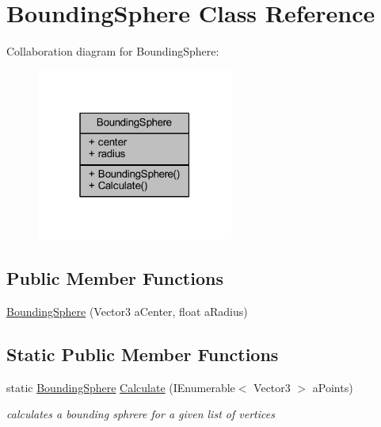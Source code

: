 \hypertarget{class_bounding_sphere}{}\section{Bounding\+Sphere Class Reference}
\label{class_bounding_sphere}


Collaboration diagram for Bounding\+Sphere\+:
\nopagebreak
\begin{figure}[H]
\begin{center}
\leavevmode
\includegraphics[width=183pt]{class_bounding_sphere__coll__graph}
\end{center}
\end{figure}
\subsection*{Public Member Functions}
\begin{DoxyCompactItemize}
\item 
\mbox{\hyperlink{class_bounding_sphere_ad35e7960a2e532e8f7cbebbca2136ef7}{Bounding\+Sphere}} (Vector3 a\+Center, float a\+Radius)
\end{DoxyCompactItemize}
\subsection*{Static Public Member Functions}
\begin{DoxyCompactItemize}
\item 
static \mbox{\hyperlink{class_bounding_sphere}{Bounding\+Sphere}} \mbox{\hyperlink{class_bounding_sphere_a29c277d13a701089666b94fabf3c87d6}{Calculate}} (I\+Enumerable$<$ Vector3 $>$ a\+Points)
\begin{DoxyCompactList}\small\item\em calculates a bounding sphrere for a given list of vertices \end{DoxyCompactList}\end{DoxyCompactItemize}
